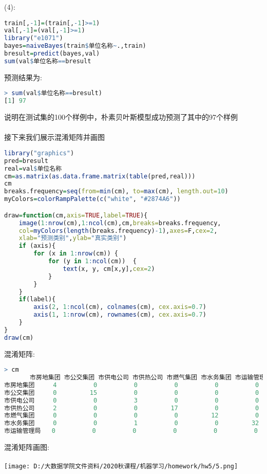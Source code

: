 \documentclass[]{article}
\begin{document}
(4):
\begin{lstlisting}[language=R]
train[,-1]=(train[,-1]>=1) 
val[,-1]=(val[,-1]>=1)
library("e1071")
bayes=naiveBayes(train$单位名称~.,train)
bresult=predict(bayes,val)
sum(val$单位名称==bresult
\end{lstlisting}
预测结果为:
\begin{lstlisting}[language=R]
> sum(val$单位名称==bresult)
[1] 97
\end{lstlisting}
说明在测试集的100个样例中，朴素贝叶斯模型成功预测了其中的97个样例\\\\
接下来我们展示混淆矩阵并画图
\begin{lstlisting}[language=R]
library("graphics")
pred=bresult 
real=val$单位名称
cm=as.matrix(as.data.frame.matrix(table(pred,real)))
cm
breaks.frequency=seq(from=min(cm), to=max(cm), length.out=10)
myColors=colorRampPalette(c("white", "#2874A6"))

draw=function(cm,axis=TRUE,label=TRUE){
	image(1:nrow(cm),1:ncol(cm),cm,breaks=breaks.frequency, 
	col=myColors(length(breaks.frequency)-1),axes=F,cex=2,
	xlab="预测类别",ylab="真实类别")
	if (axis){  
		for (x in 1:nrow(cm)) {
			for (y in 1:ncol(cm))  {
				text(x, y, cm[x,y],cex=2)
			}
		}
	}
	if(label){
		axis(2, 1:ncol(cm), colnames(cm), cex.axis=0.7)
		axis(1, 1:nrow(cm), rownames(cm), cex.axis=0.7)
	}
}
draw(cm)
\end{lstlisting}
混淆矩阵:
\begin{lstlisting}[language=R]
> cm
       市房地集团 市公交集团 市供电公司 市供热公司 市燃气集团 市水务集团 市运输管理局
市房地集团     4          0          0          0          0          0            0
市公交集团     0         15          0          0          0          0            0
市供电公司     0          0          3          0          0          0            0
市供热公司     2          0          0         17          0          0            0
市燃气集团     0          0          0          0         12          0            0
市水务集团     0          0          1          0          0         32            0
市运输管理局   0          0          0          0          0          0           14
\end{lstlisting}
混淆矩阵画图:\\\\
\texttt{[image: D:/大数据学院文件资料/2020秋课程/机器学习/homework/hw5/5.png]}\\\\
\end{document}
